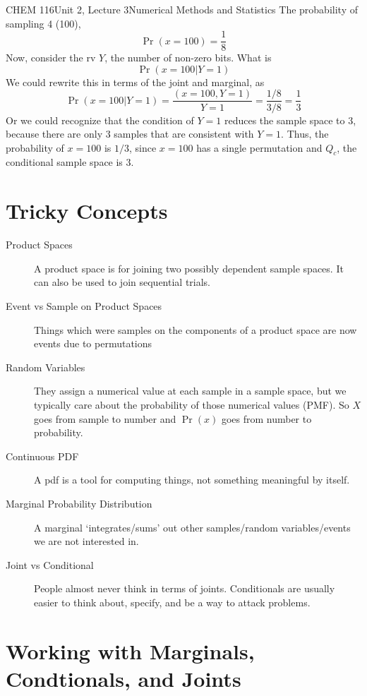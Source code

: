 \documentclass{article}
\begin{document}
\begin{tdoc}{CHEM 116}{Unit 2, Lecture 3}{Numerical Methods and Statistics}
The probability of sampling 4 (100),
\[
\Pr(x = 100) = \frac{1}{8}
\]
Now, consider the rv $Y$, the number of non-zero bits. What is
\[
\Pr(x = 100 | Y = 1)
\]
We could rewrite this in terms of the joint and marginal, as
\[
\Pr(x = 100 | Y = 1) = \frac{(x = 100, Y = 1)}{Y = 1} = \frac{1 / 8}{3 / 8} = \frac{1}{3}
\]
Or we could recognize that the condition of $Y = 1$ reduces the sample
space to 3, because there are only 3 samples that are consistent with
$Y = 1$. Thus, the probability of $x = 100$ is $1/3$, since $x = 100$
has a single permutation and $Q_c$, the conditional sample space is
$3$.

\section{Tricky Concepts}

\begin{description}

\item[Product Spaces] A product space is for joining two possibly
  dependent sample spaces. It can also be used to join sequential trials.

\item[Event vs Sample on Product Spaces] Things which were samples on
  the components of a product space are now events due to permutations

\item[Random Variables] They assign a numerical value at each sample
  in a sample space, but we typically care about the probability of
  those numerical values (PMF). So $X$ goes from sample to number and
  $\Pr(x)$ goes from number to probability.

\item[Continuous PDF] A pdf is a tool for computing things, not
  something meaningful by itself.

\item[Marginal Probability Distribution] A marginal `integrates/sums'
  out other samples/random variables/events we are not interested in.

\item[Joint vs Conditional] People almost never think in terms of
  joints. Conditionals are usually easier to think about, specify, and
  be a way to attack problems.

\end{description}

 \section{Working with Marginals, Condtionals, and Joints}


\end{tdoc}
\end{document}
